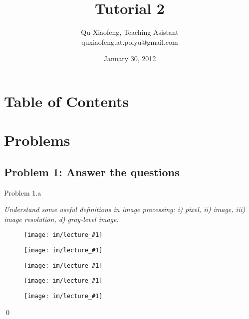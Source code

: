 \documentclass[
        ]{beamer}
\title{Tutorial 2}
\author[COMP435p]{Qu Xiaofeng\texorpdfstring{, Teaching Asistant\\\tiny{quxiaofeng.at.polyu@gmail.com}}{}}
\institute{COMP435p\\Biometrics Authentication}
\date{January 30, 2012}
\begin{document}
\newcommand{\inpdfu}[2]{\begin{figure}\centering\texttt{[image: im/lecture\_\#1]}\end{figure}}
\newcommand{\inpdfl}[2]{\begin{figure}\centering\texttt{[image: im/lecture\_\#1]}\end{figure}}
\newcommand{\inpng}[1]{\begin{figure}\centering\texttt{[image: im/\#1]}\end{figure}}

\frame{\titlepage}

\section*{Table of Contents}

    \begin{frame}{\secname}
        \tableofcontents
    \end{frame}




\section{Problems}
    \subsection{Problem 1: Answer the questions}
        \begin{frame}[c]{Problem 1.a}
    			\begin{overprint}
            \emph{Understand some useful definitions in image processing: i) pixel, ii) image, iii) image resolution, d) gray-level image.}
                \inpdfl{3}{3}
                \inpdfu{3}{4}
                \inpdfl{3}{4}
                \inpdfu{3}{5}
                \inpdfl{3}{5}\qed
            \end{overprint}            
        \end{frame}
        
\end{document}
